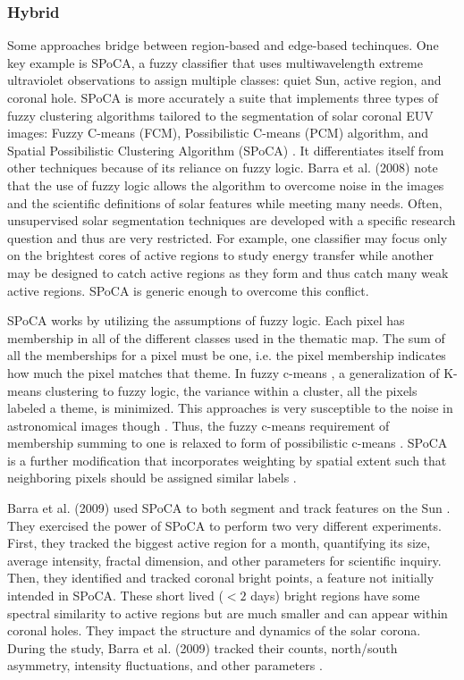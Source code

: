 \documentclass[twoside]{report}
\begin{document}
\subsubsection{Hybrid}
Some approaches bridge between region-based and edge-based techinques. One key example is SPoCA, a fuzzy classifier that uses multiwavelength extreme ultraviolet observations to assign multiple classes: quiet Sun, active region, and coronal hole. SPoCA is more accurately a suite that implements three types of fuzzy clustering algorithms tailored to the segmentation of solar coronal EUV images: Fuzzy C-means (FCM),  Possibilistic C-means (PCM) algorithm, and Spatial Possibilistic Clustering Algorithm (SPoCA) \cite{verbeeck2014spoca}. It differentiates itself from other techniques because of its reliance on fuzzy logic. Barra et al. (2008) note that the use of fuzzy logic allows the algorithm to overcome noise in the images and the scientific definitions of solar features while meeting many needs. Often, unsupervised solar segmentation techniques are developed with a specific research question and thus are very restricted. For example, one classifier may focus only on the brightest cores of active regions to study energy transfer while another may be designed to catch active regions as they form and thus catch many weak active regions. SPoCA is generic enough to overcome this conflict.

SPoCA works by utilizing the assumptions of fuzzy logic. Each pixel has membership in all of the different classes used in the thematic map. The sum of all the memberships for a pixel must be one, i.e. the pixel membership indicates how much the pixel matches that theme. In fuzzy c-means \cite{cmeans}, a generalization of K-means clustering to fuzzy logic, the variance within a cluster, all the pixels labeled a theme, is minimized. This approaches is very susceptible to the noise in astronomical images though \cite{krishnapuram1993possibilistic}. Thus, the fuzzy c-means requirement of membership summing to one is relaxed to form of possibilistic c-means \cite{krishnapuram1996possibilistic}. SPoCA is a further modification that incorporates weighting by spatial extent such that neighboring pixels should be assigned similar labels \cite{barra:2008, barra:2009}. 

Barra et al. (2009) used SPoCA to both segment and track features on the Sun \cite{barra:2009}. They exercised the power of SPoCA to perform two very different experiments. First, they tracked the biggest active region for a month, quantifying its size, average intensity, fractal dimension, and other parameters for scientific inquiry. Then, they identified and tracked coronal bright points, a feature not initially intended in SPoCA. These short lived ($< 2$ days) bright regions have some spectral similarity to active regions but are much smaller and can appear within coronal holes. They impact the structure and dynamics of the solar corona. During the study, Barra et al. (2009) tracked their counts, north/south asymmetry, intensity fluctuations, and other parameters \cite{barra:2009}.  
\end{document}

